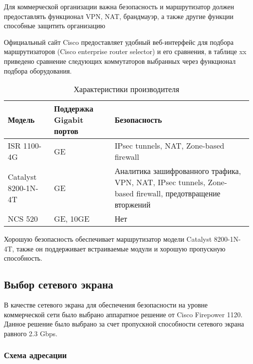 Для коммерческой организации важна безопасность и маршрутизатор должен предоставлять функционал VPN, NAT, брандмауэр, а также другие функции способные защитить организацию

Официальный сайт Cisco предоставляет удобный веб-интерфейс для подбора маршрутизаторов (Cisco enterprise router selector) и его сравнения, в таблице xx приведено сравнение следующих коммутаторов 
выбранных через функционал подбора оборудования.

\begin{table}[ht]
    \caption{Характеристики производителя}
    \label{table:func:routerList}
    \begin{tabular}{| >{\raggedright}m{}
                    | >{\raggedright\arraybackslash}m{}
                    | >{\raggedright\arraybackslash}m{}|}
        \hline
        \centering Модель
        & \centering\arraybackslash Поддержка Gigabit портов
        & \centering\arraybackslash Безопасность \\

        \hline
        ISR 1100-4G &
        GE &
        IPsec tunnels, NAT, Zone-based firewall
        \\

        \hline
        Catalyst 8200-1N-4T &
        GE &
        Аналитика зашифрованного трафика, VPN, NAT, IPsec tunnels, Zone-based firewall, предотвращение вторжений
        \\

        \hline
        NCS 520 &
        GE, 10GE &
        Нет
        \\

        \hline
    \end{tabular}
\end{table}

Хорошую безопасность обеспечивает маршрутизатор модели Catalyst 8200-1N-4T, также он поддерживает встраиваемые модули и хорошую пропускную способность.

\subsection{Выбор сетевого экрана}

В качестве сетевого экрана для обеспечения безопасности на уровне коммерческой сети было выбрано аппаратное решение от Cisco Firepower 1120.
Данное решение было выбрано за счет пропускной способности сетевого экрана равного 2.3 Gbps.

\subsubsection{Схема адресации}

